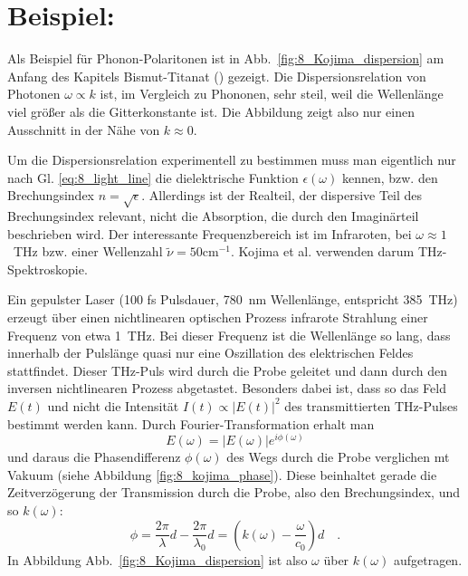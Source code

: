 \section*{Beispiel: }

Als Beispiel für Phonon-Polaritonen ist in Abb.~\ref{fig:8_Kojima_dispersion} 
am Anfang des Kapitels Bismut-Titanat () gezeigt. Die Dispersionsrelation von Photonen $\omega \propto k$ ist, im Vergleich zu Phononen, sehr steil, weil die Wellenlänge viel größer als die Gitterkonstante ist. Die Abbildung zeigt also nur einen Ausschnitt in der Nähe von $k\approx 0$. 

Um die Dispersionsrelation experimentell zu bestimmen muss man eigentlich nur nach Gl. \ref{eq:8_light_line} die dielektrische Funktion $\epsilon(\omega)$ kennen, bzw. den Brechungsindex $n = \sqrt{\epsilon}$. Allerdings ist der Realteil, der dispersive Teil des Brechungsindex relevant, nicht die Absorption, die durch den Imaginärteil beschrieben wird. Der interessante Frequenzbereich ist im Infraroten, bei $\omega \approx 1$~THz bzw. einer Wellenzahl $\tilde{\nu} = 50$cm$^{-1}$. Kojima et al.  verwenden darum THz-Spektroskopie.

Ein gepulster Laser (100 fs Pulsdauer, 780~nm Wellenlänge, entspricht 385~THz) erzeugt über einen nichtlinearen optischen Prozess infrarote Strahlung einer Frequenz von etwa 1~THz. Bei dieser Frequenz ist die Wellenlänge so lang, dass innerhalb der Pulslänge quasi nur eine Oszillation des elektrischen Feldes stattfindet. Dieser THz-Puls wird durch die Probe geleitet und dann durch den inversen nichtlinearen Prozess abgetastet. Besonders dabei ist, dass so das Feld $E(t)$ und nicht die Intensität $I(t) \propto |E(t)|^2$ des transmittierten THz-Pulses bestimmt werden kann. Durch Fourier-Transformation erhalt man 
\begin{equation}
    E(\omega) = |E(\omega)| e^{i \phi(\omega)}
\end{equation}
und daraus die Phasendifferenz $\phi(\omega)$ des Wegs durch die Probe verglichen mt Vakuum (siehe Abbildung \ref{fig:8_kojima_phase}). Diese beinhaltet gerade die Zeitverzögerung der Transmission durch die Probe, also den Brechungsindex, und so $k(\omega)$:
\begin{equation}
   \phi = \frac{2 \pi}{ \lambda} d - \frac{2 \pi}{ \lambda_0} d = \left(  k(\omega) - \frac{\omega}{c_0} \right) d \quad .
\end{equation}
In Abbildung  Abb.~\ref{fig:8_Kojima_dispersion}  ist also $\omega$ über $ k(\omega)$ aufgetragen.

